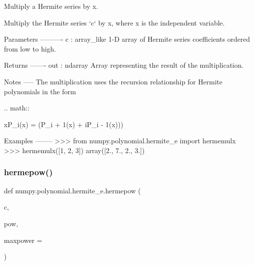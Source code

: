 \begin{DoxyVerb}Multiply a Hermite series by x.

Multiply the Hermite series `c` by x, where x is the independent
variable.


Parameters
----------
c : array_like
    1-D array of Hermite series coefficients ordered from low to
    high.

Returns
-------
out : ndarray
    Array representing the result of the multiplication.

Notes
-----
The multiplication uses the recursion relationship for Hermite
polynomials in the form

.. math::

xP_i(x) = (P_{i + 1}(x) + iP_{i - 1}(x)))

Examples
--------
>>> from numpy.polynomial.hermite_e import hermemulx
>>> hermemulx([1, 2, 3])
array([2.,  7.,  2.,  3.])\end{DoxyVerb}
 \mbox{\label{namespacenumpy_1_1polynomial_1_1hermite__e_ae5ee57ea266379a1d52c7c0e4a03d443}} 
\subsubsection{\texorpdfstring{hermepow()}{hermepow()}}
{\footnotesize\ttfamily def numpy.\+polynomial.\+hermite\+\_\+e.\+hermepow (\begin{DoxyParamCaption}\item[{}]{c,  }\item[{}]{pow,  }\item[{}]{maxpower = {} }\end{DoxyParamCaption})}

